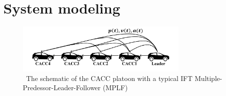 \documentclass[a4paper]{cas-sc}
\begin{document}









\section{System modeling}
\label{Section 3}

\begin{figure}
  \centering

  \includegraphics[width=8.5cm]{figs/fig1.png}
  \caption{~The schematic of the CACC platoon with a typical IFT Multiple-Predessor-Leader-Follower (MPLF)}
  \label{fig1}
\end{figure}
\end{document}
